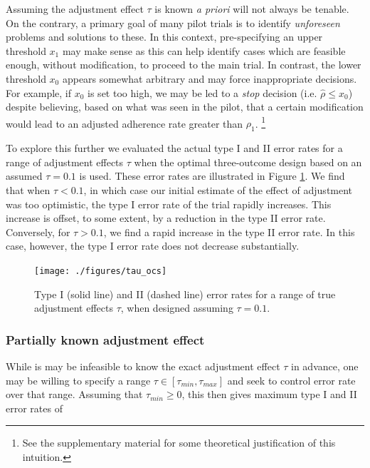 \documentclass{bmcart}
\begin{document}
Assuming the adjustment effect $\tau$ is known \emph{a priori} will not always be tenable. On the contrary, a primary goal of many pilot trials is to identify \emph{unforeseen} problems and solutions to these. In this context, pre-specifying an upper threshold $x_1$ may make sense as this can help identify cases which are feasible enough, without modification, to proceed to the main trial. In contrast, the lower threshold $x_0$ appears somewhat arbitrary and may force inappropriate decisions. For example, if $x_0$ is set too high, we may be led to a \emph{stop} decision (i.e. $\hat{\rho} \leq x_0$) despite believing, based on what was seen in the pilot, that a certain modification would lead to an adjusted adherence rate greater than $\rho_1$.
\footnote{See the supplementary material for some theoretical justification of this intuition.}

To explore this further we evaluated the actual type I and II error rates for a range of adjustment effects $\tau$ when the optimal three-outcome design based on an assumed $\tau = 0.1$ is used. These error rates are illustrated in Figure \ref{fig:tau_ocs}. We find that when $\tau < 0.1$, in which case our initial estimate of the effect of adjustment was too optimistic, the type I error rate of the trial rapidly increases. This increase is offset, to some extent, by a reduction in the type II error rate. Conversely, for $\tau > 0.1$, we find a rapid increase in the type II error rate. In this case, however, the type I error rate does not decrease substantially. 

\begin{figure}
\centering
\texttt{[image: ./figures/tau\_ocs]}
\caption{Type I (solid line) and II (dashed line) error rates for a range of true adjustment effects $\tau$, when designed assuming $\tau = 0.1$.}
\label{fig:tau_ocs}
\end{figure}

\subsubsection{Partially known adjustment effect}

While is may be infeasible to know the exact adjustment effect $\tau$ in advance, one may be willing to specify a range $\tau \in [\tau_{min}, \tau_{max}]$ and seek to control error rate over that range. Assuming that $\tau_{min} \geq 0$, this then gives maximum type I and II error rates of
\end{document}
